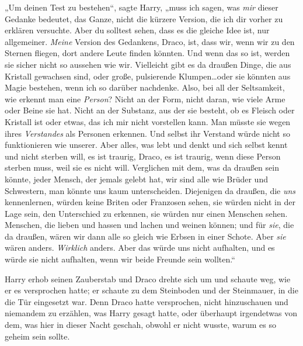 „Um deinen Test zu bestehen“, sagte Harry, „muss ich sagen, was \emph{mir} dieser Gedanke bedeutet, das Ganze, nicht die kürzere Version, die ich dir vorher zu erklären versuchte. Aber du solltest sehen, dass es die gleiche Idee ist, nur allgemeiner. \emph{Meine} Version des Gedankens, Draco, ist, dass wir, wenn wir zu den Sternen fliegen, dort andere Leute finden könnten. Und wenn das so ist, werden sie sicher nicht so aussehen wie wir. Vielleicht gibt es da draußen Dinge, die aus Kristall gewachsen sind, oder große, pulsierende Klumpen…oder sie könnten aus Magie bestehen, wenn ich so darüber nachdenke. Also, bei all der Seltsamkeit, wie erkennt man eine \emph{Person}? Nicht an der Form, nicht daran, wie viele Arme oder Beine sie hat. Nicht an der Substanz, aus der sie besteht, ob es Fleisch oder Kristall ist oder etwas, das ich mir nicht vorstellen kann. Man müsste sie wegen ihres \emph{Verstandes} als Personen erkennen. Und selbst ihr Verstand würde nicht so funktionieren wie unserer. Aber alles, was lebt und denkt und sich selbst kennt und nicht sterben will, es ist traurig, Draco, es ist traurig, wenn diese Person sterben muss, weil sie es nicht will. Verglichen mit dem, was da draußen sein könnte, jeder Mensch, der jemals gelebt hat, wir sind alle wie Brüder und Schwestern, man könnte uns kaum unterscheiden. Diejenigen da draußen, die \emph{uns} kennenlernen, würden keine Briten oder Franzosen sehen, sie würden nicht in der Lage sein, den Unterschied zu erkennen, sie würden nur einen Menschen sehen. Menschen, die lieben und hassen und lachen und weinen können; und für \emph{sie}, die da draußen, wären wir dann alle so gleich wie Erbsen in einer Schote. Aber \emph{sie} wären anders. \emph{Wirklich} anders. Aber das würde uns nicht aufhalten, und es würde sie nicht aufhalten, wenn wir beide Freunde sein wollten.“

Harry erhob seinen Zauberstab und Draco drehte sich um und schaute weg, wie er es versprochen hatte; er schaute zu dem Steinboden und der Steinmauer, in die die Tür eingesetzt war. Denn Draco hatte versprochen, nicht hinzuschauen und niemandem zu erzählen, was Harry gesagt hatte, oder überhaupt irgendetwas von dem, was hier in dieser Nacht geschah, obwohl er nicht wusste, warum es so geheim sein sollte.


